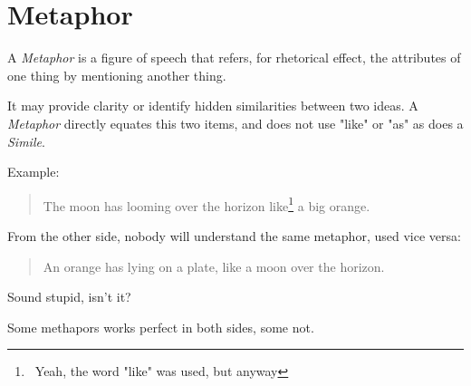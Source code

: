 \section{Metaphor}
\label{sec:Metaphor}

A \emph{Metaphor} is a figure of speech that refers, for rhetorical effect, the attributes of one thing by mentioning another thing.

It may provide clarity or identify hidden similarities between two ideas. A \textit{Metaphor} directly equates this two items, and does not use "like" or "as" as does a \textit{Simile}. 

Example: 

\begin{verse}
The moon has looming over the horizon like\footnote{~Yeah, the word "like" was used, but anyway} a big orange. 
\end{verse} 

From the other side, nobody will understand the same metaphor, used vice versa:

\begin{verse}
An orange has lying on a plate, like a moon over the horizon. 
\end{verse} 

Sound stupid, isn't it?

Some methapors works perfect in both sides, some not.

